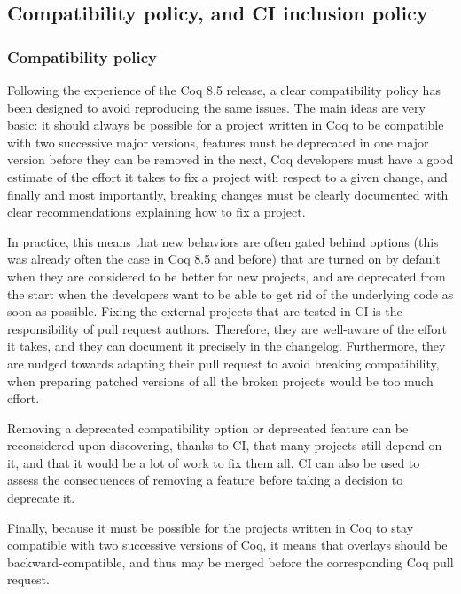\subsection{Compatibility policy, and CI inclusion policy}

\subsubsection{Compatibility policy}

\label{sec:compatibility-policy}

Following the experience of the Coq 8.5 release, a clear compatibility policy has been designed to avoid reproducing the same issues. The main ideas are very basic: it should always be possible for a project written in Coq to be compatible with two successive major versions, features must be deprecated in one major version before they can be removed in the next, Coq developers must have a good estimate of the effort it takes to fix a project with respect to a given change, and finally and most importantly, breaking changes must be clearly documented with clear recommendations explaining how to fix a project.

In practice, this means that new behaviors are often gated behind options (this was already often the case in Coq 8.5 and before) that are turned on by default when they are considered to be better for new projects, and are deprecated from the start when the developers want to be able to get rid of the underlying code as soon as possible.
Fixing the external projects that are tested in CI is the responsibility of pull request authors.
Therefore, they are well-aware of the effort it takes, and they can document it precisely in the changelog.
Furthermore, they are nudged towards adapting their pull request to avoid breaking compatibility, when preparing patched versions of all the broken projects would be too much effort.

Removing a deprecated compatibility option or deprecated feature can be reconsidered upon discovering, thanks to CI, that many projects still depend on it, and that it would be a lot of work to fix them all.
CI can also be used to assess the consequences of removing a feature before taking a decision to deprecate it.

Finally, because it must be possible for the projects written in Coq to stay compatible with two successive versions of Coq, it means that overlays should be backward-compatible, and thus may be merged before the corresponding Coq pull request.

